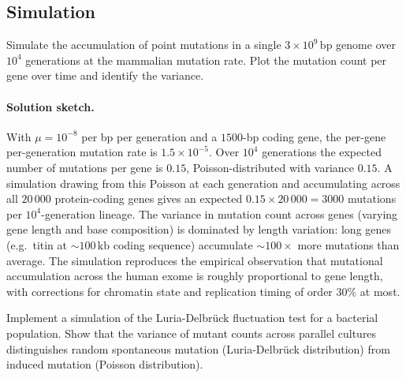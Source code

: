 \subsection*{Simulation}

\begin{exercise}
Simulate the accumulation of point mutations in a single
$3 \times 10^9\,\text{bp}$ genome over $10^4$ generations at the
mammalian mutation rate. Plot the mutation count per gene over time
and identify the variance.
\end{exercise}

\paragraph{Solution sketch.} With $\mu = 10^{-8}$ per bp per
generation and a $1500$-bp coding gene, the per-gene per-generation
mutation rate is $1.5 \times 10^{-5}$. Over $10^4$ generations the
expected number of mutations per gene is $0.15$, Poisson-distributed
with variance $0.15$. A simulation drawing from this Poisson at each
generation and accumulating across all $20\,000$ protein-coding genes
gives an expected $0.15 \times 20\,000 = 3000$ mutations per
$10^4$-generation lineage. The variance in mutation count across
genes (varying gene length and base composition) is dominated by
length variation: long genes (e.g.\ titin at $\sim 100\,\text{kb}$
coding sequence) accumulate $\sim 100 \times$ more mutations than
average. The simulation reproduces the empirical observation that
mutational accumulation across the human exome is roughly proportional
to gene length, with corrections for chromatin state and replication
timing of order $30\%$ at most.

\begin{exercise}
Implement a simulation of the Luria-Delbr\"uck fluctuation test for a
bacterial population. Show that the variance of mutant counts across
parallel cultures distinguishes random spontaneous mutation
(Luria-Delbr\"uck distribution) from induced mutation (Poisson
distribution).
\end{exercise}

